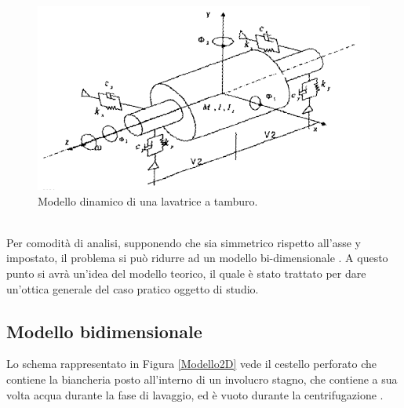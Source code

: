 \begin{figure}[h]
    \centering
    \includegraphics[scale=0.5]{Immagini/ModelloRotore.png}
    \caption{Modello dinamico di una lavatrice a tamburo.}
    \label{ModelloRotore}
\end{figure}\\
Per comodità di analisi, supponendo che sia simmetrico rispetto all'asse y impostato, il problema si può ridurre ad un modello bi-dimensionale \cite{choi2003study}. 
A questo punto si avrà un'idea del modello teorico, il quale è stato trattato per dare un'ottica generale del caso pratico oggetto di studio.
\subsection{Modello bidimensionale}
Lo schema rappresentato in Figura \ref{Modello2D} vede il cestello perforato che contiene la biancheria posto all'interno di un involucro stagno, che contiene a sua volta acqua durante la fase di lavaggio, ed è vuoto durante la centrifugazione \cite{esercitazioneapplicata}.

